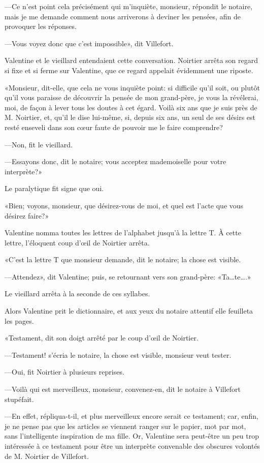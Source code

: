 —Ce n'est point cela précisément qui m'inquiète, monsieur, répondit le notaire, mais je me demande comment nous arriverons à deviner les pensées, afin de provoquer les réponses. 

—Vous voyez donc que c'est impossible», dit Villefort. 

Valentine et le vieillard entendaient cette conversation. Noirtier arrêta son regard si fixe et si ferme sur Valentine, que ce regard appelait évidemment une riposte. 

«Monsieur, dit-elle, que cela ne vous inquiète point: si difficile qu'il soit, ou plutôt qu'il vous paraisse de découvrir la pensée de mon grand-père, je vous la révélerai, moi, de façon à lever tous les doutes à cet égard. Voilà six ans que je suis près de M. Noirtier, et, qu'il le dise lui-même, si, depuis six ans, un seul de ses désirs est resté enseveli dans son cœur faute de pouvoir me le faire comprendre? 

—Non, fit le vieillard. 

—Essayons donc, dit le notaire; vous acceptez mademoiselle pour votre interprète?» 

Le paralytique fit signe que oui. 

«Bien; voyons, monsieur, que désirez-vous de moi, et quel est l'acte que vous désirez faire?» 

Valentine nomma toutes les lettres de l'alphabet jusqu'à la lettre T. À cette lettre, l'éloquent coup d'œil de Noirtier arrêta. 

«C'est la lettre T que monsieur demande, dit le notaire; la chose est visible. 

—Attendez», dit Valentine; puis, se retournant vers son grand-père: «Ta\dots te\dots.» 

Le vieillard arrêta à la seconde de ces syllabes. 

Alors Valentine prit le dictionnaire, et aux yeux du notaire attentif elle feuilleta les pages. 

«Testament, dit son doigt arrêté par le coup d'œil de Noirtier.  

—Testament! s'écria le notaire, la chose est visible, monsieur veut tester. 

—Oui, fit Noirtier à plusieurs reprises. 

—Voilà qui est merveilleux, monsieur, convenez-en, dit le notaire à Villefort stupéfait. 

—En effet, répliqua-t-il, et plus merveilleux encore serait ce testament; car, enfin, je ne pense pas que les articles se viennent ranger sur le papier, mot par mot, sans l'intelligente inspiration de ma fille. Or, Valentine sera peut-être un peu trop intéressée à ce testament pour être un interprète convenable des obscures volontés de M. Noirtier de Villefort. 

